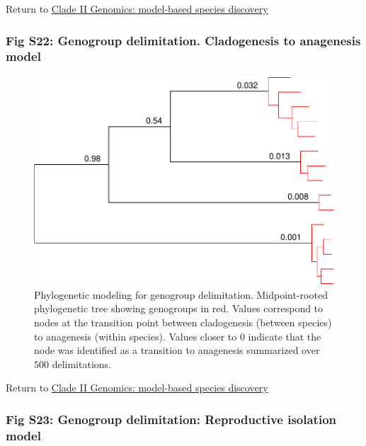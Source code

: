 \documentclass[
  11pt,
]{article}
\begin{document}
Return to \protect\hyperlink{model-based-species-discovery-3}{Clade II Genomics: model-based species discovery}
\pagebreak

\hypertarget{fig-s22-genogroup-delimitation.-cladogenesis-to-anagenesis-model}{%
\subsubsection{Fig S22: Genogroup delimitation. Cladogenesis to anagenesis model}\label{fig-s22-genogroup-delimitation.-cladogenesis-to-anagenesis-model}}

\begin{figure}
\includegraphics[height=.6\textwidth,]{Supplementary_Material_files/figure-latex/cladeIImolecularDelimitationsPhylogeny2-1} \caption{Phylogenetic modeling for genogroup delimitation. Midpoint-rooted phylogenetic tree showing genogroups in red. Values correspond to nodes at the transition point between cladogenesis (between species) to anagenesis (within species). Values closer to 0 indicate that the node was identified as a transition to anagenesis summarized over $500$ delimitations.}\label{fig:cladeIImolecularDelimitationsPhylogeny2}
\end{figure}

Return to \protect\hyperlink{model-based-species-discovery-3}{Clade II Genomics: model-based species discovery}
\pagebreak

\hypertarget{fig-s23-genogroup-delimitation-reproductive-isolation-model}{%
\subsubsection{Fig S23: Genogroup delimitation: Reproductive isolation model}\label{fig-s23-genogroup-delimitation-reproductive-isolation-model}}
\end{document}
